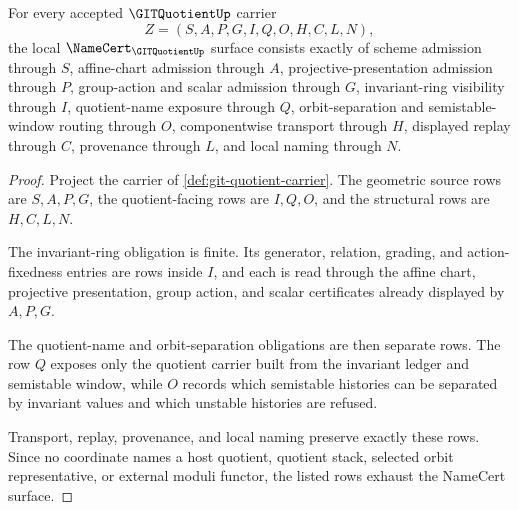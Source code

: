 \begin{theorem}
\label{thm:git-quotient-namecert-obligations}
For every accepted $\GITQuotientUp$ carrier
$$
Z=(S,A,P,G,I,Q,O,H,C,L,N),
$$
the local $\NameCert_{\GITQuotientUp}$ surface consists exactly of scheme admission through $S$, affine-chart admission through $A$, projective-presentation admission through $P$, group-action and scalar admission through $G$, invariant-ring visibility through $I$, quotient-name exposure through $Q$, orbit-separation and semistable-window routing through $O$, componentwise transport through $H$, displayed replay through $C$, provenance through $L$, and local naming through $N$.
\end{theorem}
\begin{proof}
Project the carrier of \autoref{def:git-quotient-carrier}. The geometric source rows are $S,A,P,G$, the quotient-facing rows are $I,Q,O$, and the structural rows are $H,C,L,N$.

The invariant-ring obligation is finite. Its generator, relation, grading, and action-fixedness entries are rows inside $I$, and each is read through the affine chart, projective presentation, group action, and scalar certificates already displayed by $A,P,G$.

The quotient-name and orbit-separation obligations are then separate rows. The row $Q$ exposes only the quotient carrier built from the invariant ledger and semistable window, while $O$ records which semistable histories can be separated by invariant values and which unstable histories are refused.

Transport, replay, provenance, and local naming preserve exactly these rows. Since no coordinate names a host quotient, quotient stack, selected orbit representative, or external moduli functor, the listed rows exhaust the NameCert surface.
\end{proof}

